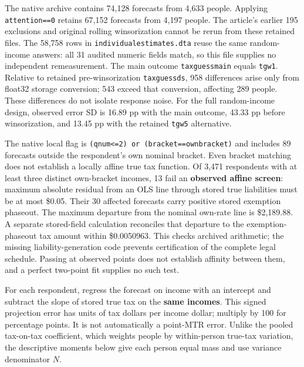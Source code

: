 \documentclass[
  11pt,
  letterpaper,
  DIV=11,
  numbers=noendperiod]{scrartcl}
\begin{document}
The native archive contains 74,128 forecasts from 4,633 people. Applying
\texttt{attention==0} retains 67,152 forecasts from 4,197 people. The
article's earlier 195 exclusions and original rolling winsorization
cannot be rerun from these retained files. The 58,758 rows in
\texttt{individualestimates.dta} reuse the same random-income answers:
all 31 audited numeric fields match, so this file supplies no
independent remeasurement. The main outcome \texttt{taxguessmain} equals
\texttt{tgw1}. Relative to retained pre-winsorization
\texttt{taxguessds}, 958 differences arise only from float32 storage
conversion; 543 exceed that conversion, affecting 289 people. These
differences do not isolate response noise. For the full random-income
design, observed error SD is 16.89 pp with the main outcome, 43.33 pp
before winsorization, and 13.45 pp with the retained \texttt{tgw5}
alternative.

The native local flag is
\texttt{(qnum\textless{}=2)\ or\ (bracket==ownbracket)} and includes 89
forecasts outside the respondent's own nominal bracket. Even bracket
matching does not establish a locally affine true tax function. Of 3,471
respondents with at least three distinct own-bracket incomes, 13 fail an
\textbf{observed affine screen}: maximum absolute residual from an OLS
line through stored true liabilities must be at most \$0.05. Their 30
affected forecasts carry positive stored exemption phaseout. The maximum
departure from the nominal own-rate line is \$2,189.88. A separate
stored-field calculation reconciles that departure to the
exemption-phaseout tax amount within \$0.0050963. This checks archived
arithmetic; the missing liability-generation code prevents certification
of the complete legal schedule. Passing at observed points does not
establish affinity between them, and a perfect two-point fit supplies no
such test.

For each respondent, regress the forecast on income with an intercept
and subtract the slope of stored true tax on the \textbf{same incomes}.
This signed projection error has units of tax dollars per income dollar;
multiply by 100 for percentage points. It is not automatically a
point-MTR error. Unlike the pooled tax-on-tax coefficient, which weights
people by within-person true-tax variation, the descriptive moments
below give each person equal mass and use variance denominator \(N\).
\end{document}
